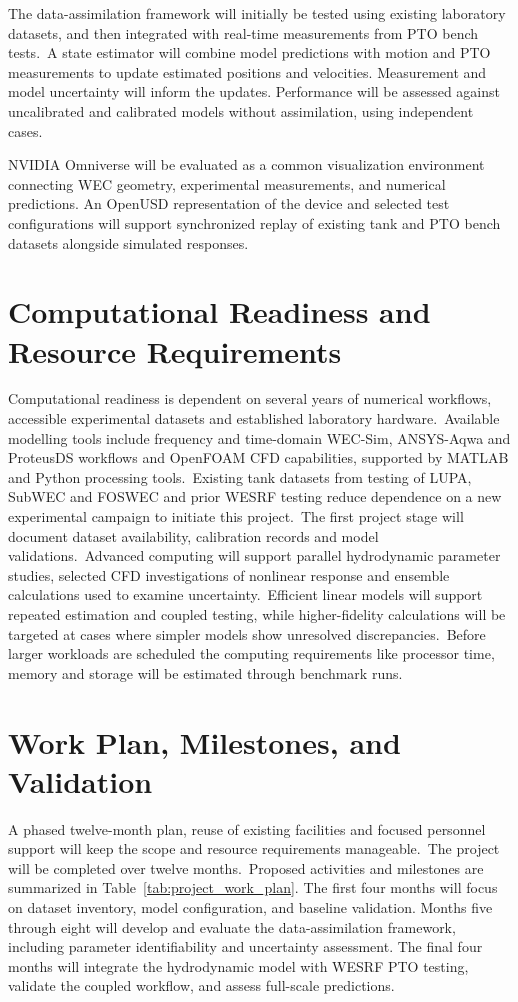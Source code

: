 \documentclass[11pt]{article}
\begin{document}
The data-assimilation framework will initially be tested using existing laboratory datasets, and then integrated with real-time measurements from PTO bench tests.~A state estimator will combine model predictions with motion and PTO measurements to update estimated positions and velocities. Measurement and model uncertainty will inform the updates. Performance will be assessed against uncalibrated and calibrated models without assimilation, using independent cases.

NVIDIA Omniverse will be evaluated as a common visualization environment connecting WEC geometry, experimental measurements, and numerical predictions. An OpenUSD representation of the device and selected test configurations will support synchronized replay of existing tank and PTO bench datasets alongside simulated responses.

\section{Computational Readiness and Resource Requirements}
Computational readiness is dependent on several years of numerical workflows, accessible experimental datasets and established laboratory hardware.~Available modelling tools include frequency and time-domain WEC-Sim, ANSYS-Aqwa and ProteusDS workflows and OpenFOAM CFD capabilities, supported by MATLAB and Python processing tools.~Existing tank datasets from testing of LUPA, SubWEC and FOSWEC and prior WESRF testing reduce dependence on a new experimental campaign to initiate this project.~The first project stage will document dataset availability, calibration records and model validations.~Advanced computing will support parallel hydrodynamic parameter studies, selected CFD investigations of nonlinear response and ensemble calculations used to examine uncertainty.~Efficient linear models will support repeated estimation and coupled testing, while higher-fidelity calculations will be targeted at cases where simpler models show unresolved discrepancies.~Before larger workloads are scheduled the computing requirements like processor time, memory and storage will be estimated through benchmark runs.
\section{Work Plan, Milestones, and Validation}
A phased twelve-month plan, reuse of existing facilities and focused personnel support will keep the scope and resource requirements manageable.~The project will be completed over twelve months.~Proposed activities and milestones are summarized in Table~\ref{tab:project_work_plan}. The first four months will focus on dataset inventory, model configuration, and baseline validation. Months five through eight will develop and evaluate the data-assimilation framework, including parameter identifiability and uncertainty assessment. The final four months will integrate the hydrodynamic model with WESRF PTO testing, validate the coupled workflow, and assess full-scale predictions.
\end{document}
